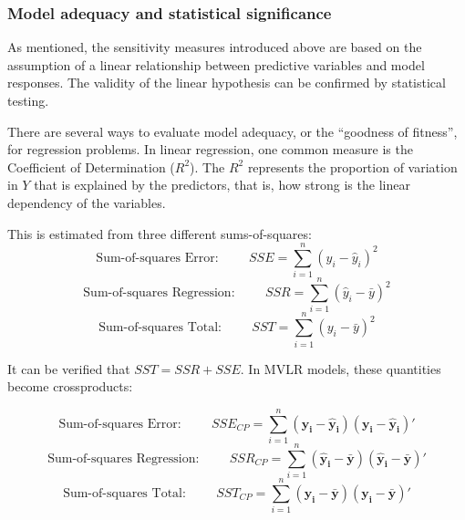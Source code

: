 \documentclass[12pt]{article}
\begin{document}
{%

\subsubsection{Model adequacy and statistical significance}

As mentioned, the sensitivity measures introduced above are based on the assumption of a linear relationship between predictive variables and model responses. The validity of the linear hypothesis can be confirmed by statistical testing.

There are several ways to evaluate model adequacy, or the ``goodness of fitness'', for regression problems. In linear regression, one common measure is the Coefficient of Determination ($R^{2}$). The $R^{2}$ represents the proportion of variation in $Y$ that is explained by the predictors, that is, how strong is the linear dependency of the variables.

This is estimated from three different sums-of-squares:
\begin{equation}
\text{Sum-of-squares Error:} \hspace{1cm} SSE=\sum^{n}_{i=1}(y_{i}-\hat y_{i})^{2}
\end{equation}
\begin{equation}
\text{Sum-of-squares Regression:} \hspace{1cm} SSR=\sum^{n}_{i=1}(\hat y_{i}-\bar y)^{2}
\end{equation}
\begin{equation}
\text{Sum-of-squares Total:} \hspace{1cm} SST=\sum^{n}_{i=1}(y_{i}-\bar y)^{2}
\end{equation}

\vspace{0.5cm}
It can be verified that $SST = SSR + SSE$. In MVLR models, these quantities become crossproducts:

\begin{equation}
\text{Sum-of-squares Error:} \hspace{1cm} SSE_{CP}=\sum^{n}_{i=1}(\mathbf{y_{i}}-\mathbf{\hat y_{i}})(\mathbf{y_{i}}-\mathbf{\hat y_{i}})'
\end{equation}
\begin{equation}
\text{Sum-of-squares Regression:} \hspace{1cm} SSR_{CP}=\sum^{n}_{i=1}(\mathbf{\hat y_{i}}-\mathbf{\bar y})(\mathbf{\hat y_{i}}-\mathbf{\bar y})'
\end{equation}
\begin{equation}
\text{Sum-of-squares Total:} \hspace{1cm} SST_{CP}=\sum^{n}_{i=1}(\mathbf{y_{i}}-\mathbf{\bar y})(\mathbf{y_{i}}-\mathbf{\bar y})'
\end{equation}

}
\end{document}
